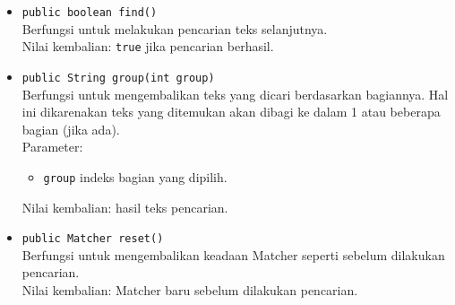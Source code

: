 \begin{enumerate}
\begin{itemize}
		\item \texttt{public boolean find()}\\
		Berfungsi untuk melakukan pencarian teks selanjutnya.\\
		Nilai kembalian: \texttt{true} jika pencarian berhasil.
		\item \texttt{public String group(int group)}\\
		Berfungsi untuk mengembalikan teks yang dicari berdasarkan bagiannya. Hal ini dikarenakan teks yang ditemukan akan dibagi ke dalam 1 atau beberapa bagian (jika ada).\\
		Parameter:
		\begin{itemize}
			\item \texttt{group} indeks bagian yang dipilih.
		\end{itemize}
		Nilai kembalian: hasil teks pencarian.
		\item \texttt{public Matcher reset()}\\
		Berfungsi untuk mengembalikan keadaan Matcher seperti sebelum dilakukan pencarian.\\
		Nilai kembalian: Matcher baru sebelum dilakukan pencarian.
	\end{itemize}
\end{enumerate}